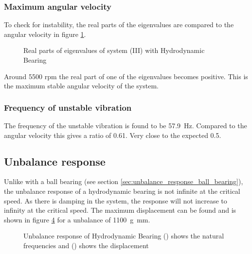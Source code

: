 \subsubsection{Maximum angular velocity}
To check for instability, the real parts of the eigenvalues are compared to the angular velocity in figure \ref{fig:hydrodynamic_bearing_eigenvalues}.
\begin{figure}[ht]
    \centering
    
    \caption{Real parts of eigenvalues of system (III) with Hydrodynamic Bearing}
    \label{fig:hydrodynamic_bearing_eigenvalues}
\end{figure}
Around 5500 rpm the real part of one of the eigenvalues becomes positive. This is the maximum stable angular velocity of the system.

\subsubsection{Frequency of unstable vibration}
The frequency of the unstable vibration is found to be \SI{57.9}{\hertz}. Compared to the angular velocity this gives a ratio of 0.61. Very close to the expected 0.5.

\subsection{Unbalance response}
Unlike with a ball bearing (see section \ref{sec:unbalance_response_ball_bearing}), the unbalance response of a hydrodynamic bearing is not infinite at the critical speed. As there is damping in the system, the response will not increase to infinity at the critical speed. The maximum displacement can be found and is shown in figure \ref{fig:hydrodynamic_bearing_unbalance_response} for a unbalance of \SI{1100}{\gram \milli \meter}.
%    

\begin{figure}[ht]
\begin{subfigure}[t]{0.49\textwidth}
    \centering
    
    \caption{}
    \label{fig:hydrodynamic_bearing_unbalance_response_natural}
\end{subfigure}
\hfill
\begin{subfigure}[t]{0.49\textwidth}
    \centering
    
    \caption{}
    \label{fig:hydrodynamic_bearing_unbalance_response_disp}
\end{subfigure}
\caption{Unbalance response of Hydrodynamic Bearing () shows the natural frequencies and () shows the displacement}
\label{fig:hydrodynamic_bearing_unbalance_response}
\end{figure}

